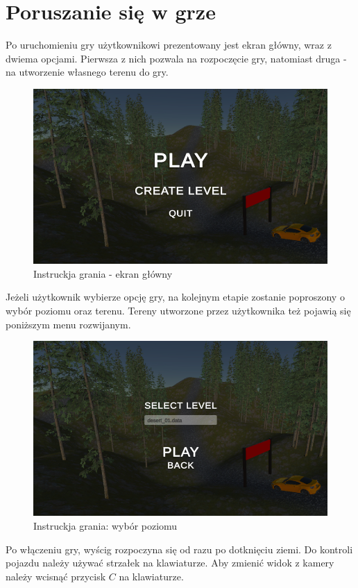 \section{Poruszanie się w grze}
    Po uruchomieniu gry użytkownikowi prezentowany jest ekran główny, wraz z dwiema opcjami. Pierwsza z nich pozwala na rozpoczęcie gry, 
    natomiast druga - na utworzenie własnego terenu do gry.
    \begin{figure}[H]
        \centering
        \includegraphics[width=.8\textwidth]{figures/game_instruction_start.png}
        \caption{Instruckja grania - ekran główny}
        \label{fig}
    \end{figure}
    Jeżeli użytkownik wybierze opcję gry, na kolejnym etapie zostanie poproszony o wybór poziomu oraz terenu. 
    Tereny utworzone przez użytkownika też pojawią się poniższym menu rozwijanym.
    \begin{figure}[H]
        \centering
        \includegraphics[width=.8\textwidth]{figures/game_instruction_choose_level.png}
        \caption{Instruckja grania: wybór poziomu}
        \label{fig}
    \end{figure}
    Po włączeniu gry, wyścig rozpoczyna się od razu po dotknięciu ziemi. Do kontroli pojazdu należy używać strzałek na klawiaturze.
    Aby zmienić widok z kamery należy wcisnąć przycisk $C$ na klawiaturze.
